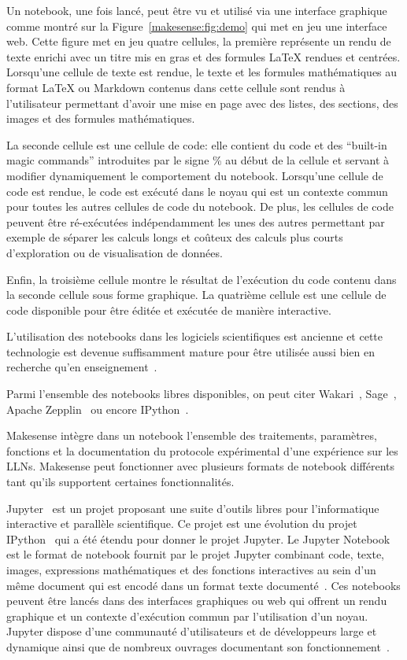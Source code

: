 Un notebook, une fois lancé, peut être vu et utilisé via une interface graphique comme montré sur la Figure~\ref{makesense:fig:demo} qui met en jeu une interface web.
Cette figure met en jeu quatre cellules, la première représente un rendu de texte enrichi avec un titre mis en gras et des formules \LaTeX{} rendues et centrées.
Lorsqu'une cellule de texte est rendue, le texte et les formules mathématiques au format \LaTeX{} ou Markdown contenus  dans cette cellule sont rendus à l'utilisateur permettant d'avoir une mise en page avec des listes, des sections, des images et des formules mathématiques.

La seconde cellule est une cellule de code: elle contient du code et des ``built-in magic commands'' introduites par le signe \% au début de la cellule et servant à modifier dynamiquement le comportement du notebook.
Lorsqu'une cellule de code est rendue, le code est exécuté dans le noyau qui est un contexte commun pour toutes les autres cellules de code du notebook.
De plus, les cellules de code peuvent être ré-exécutées indépendamment les unes des autres permettant par exemple de séparer les calculs longs et coûteux des calculs plus courts d'exploration ou de visualisation de données.

Enfin, la troisième cellule montre le résultat de l'exécution du code contenu dans la seconde cellule sous forme graphique.
La quatrième cellule est une cellule de code disponible pour être éditée et exécutée de manière interactive.

L'utilisation des notebooks dans les logiciels scientifiques est ancienne et cette technologie est devenue suffisamment mature pour être utilisée aussi bien en recherche qu'en enseignement~\cite{gray1991exploring,young2003science,stevens2013automated,perez2013open}.

Parmi l'ensemble des notebooks libres disponibles, on peut citer Wakari~\cite{tsaftaris2014scientist}, Sage~\cite{stein2008sage}, Apache Zepplin~\cite{manivannan2015scala} ou encore IPython~\cite{PER-GRA:2007}.

Makesense intègre dans un notebook l'ensemble des traitements, paramètres, fonctions et la documentation du protocole expérimental d'une expérience sur les \ac{LLN}s.
Makesense peut fonctionner avec plusieurs formats de notebook différents tant qu'ils supportent certaines fonctionnalités.

Jupyter~\cite{poweredbyjupyter} est un projet proposant une suite d'outils libres pour l'informatique interactive et parallèle scientifique.
Ce projet est une évolution du projet IPython~\cite{PER-GRA:2007} qui a été étendu pour donner le projet Jupyter.
Le Jupyter Notebook est le format de notebook fournit par le projet Jupyter combinant code, texte, images, expressions mathématiques et des fonctions interactives au sein d'un même document qui est encodé dans un format texte documenté~\cite{notebookformat}.
Ces notebooks peuvent être lancés dans des interfaces graphiques ou web qui offrent un rendu graphique et un contexte d'exécution commun par l'utilisation d'un noyau.
Jupyter dispose d'une communauté d'utilisateurs et de développeurs large et dynamique ainsi que de nombreux ouvrages documentant son fonctionnement~\cite{mckinney2012python}.


